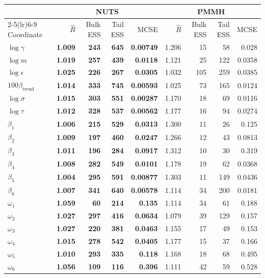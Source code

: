 \begin{tabular}{lrrrrrrrr}
\toprule
& \multicolumn{4}{c}{NUTS} & \multicolumn{4}{c}{PMMH} \\
\cmidrule(lr){2-5}\cmidrule(lr){6-9}
Coordinate & $\widehat R$ & Bulk ESS & Tail ESS & MCSE & $\widehat R$ & Bulk ESS & Tail ESS & MCSE \\
\midrule
$\log\gamma$ & \textbf{1.009} & \textbf{243} & \textbf{645} & \textbf{0.00749} & 1.206 & 15 & 58 & 0.028 \\
$\log m$ & \textbf{1.019} & \textbf{257} & \textbf{439} & \textbf{0.0118} & 1.121 & 25 & 122 & 0.0358 \\
$\log\epsilon$ & \textbf{1.025} & \textbf{226} & \textbf{267} & \textbf{0.0305} & 1.032 & 105 & 259 & 0.0385 \\
$100\beta_{\mathrm{trend}}$ & \textbf{1.014} & \textbf{333} & \textbf{745} & \textbf{0.00593} & 1.025 & 73 & 165 & 0.0124 \\
$\log\sigma$ & \textbf{1.015} & \textbf{303} & \textbf{551} & \textbf{0.00287} & 1.170 & 18 & 69 & 0.0116 \\
$\log\tau$ & \textbf{1.012} & \textbf{328} & \textbf{537} & \textbf{0.00562} & 1.177 & 16 & 94 & 0.0274 \\
$\beta_1$ & \textbf{1.006} & \textbf{215} & \textbf{529} & \textbf{0.0313} & 1.300 & 11 & 26 & 0.125 \\
$\beta_2$ & \textbf{1.009} & \textbf{197} & \textbf{460} & \textbf{0.0247} & 1.266 & 12 & 43 & 0.0813 \\
$\beta_3$ & \textbf{1.011} & \textbf{196} & \textbf{284} & \textbf{0.0917} & 1.312 & 10 & 30 & 0.319 \\
$\beta_4$ & \textbf{1.008} & \textbf{282} & \textbf{549} & \textbf{0.0101} & 1.178 & 19 & 62 & 0.0368 \\
$\beta_5$ & \textbf{1.004} & \textbf{295} & \textbf{591} & \textbf{0.00877} & 1.303 & 11 & 149 & 0.0436 \\
$\beta_6$ & \textbf{1.007} & \textbf{341} & \textbf{640} & \textbf{0.00578} & 1.114 & 34 & 200 & 0.0181 \\
$\omega_1$ & \textbf{1.059} & \textbf{60} & \textbf{214} & \textbf{0.135} & 1.114 & 34 & 61 & 0.188 \\
$\omega_2$ & \textbf{1.027} & \textbf{297} & \textbf{416} & \textbf{0.0634} & 1.079 & 39 & 129 & 0.157 \\
$\omega_3$ & \textbf{1.027} & \textbf{220} & \textbf{381} & \textbf{0.0463} & 1.155 & 17 & 49 & 0.153 \\
$\omega_4$ & \textbf{1.015} & \textbf{278} & \textbf{542} & \textbf{0.0405} & 1.177 & 15 & 37 & 0.166 \\
$\omega_5$ & \textbf{1.010} & \textbf{293} & \textbf{335} & \textbf{0.118} & 1.168 & 18 & 68 & 0.495 \\
$\omega_6$ & \textbf{1.056} & \textbf{109} & \textbf{116} & \textbf{0.396} & 1.111 & 42 & 59 & 0.528 \\
\bottomrule
\end{tabular}
